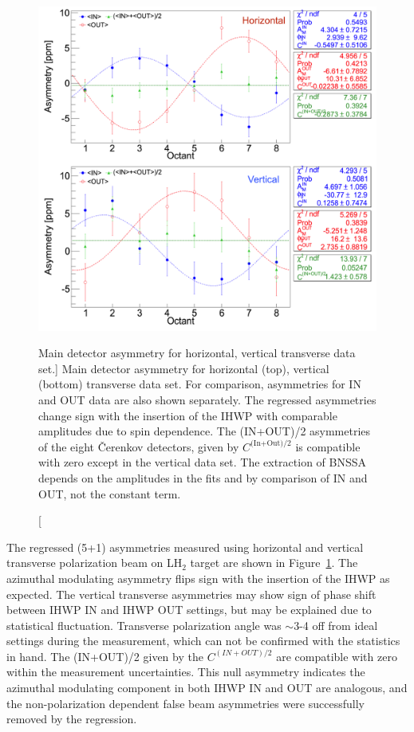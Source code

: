 \begin{figure}[!h]
	\begin{center}
	\includegraphics[width=15.0cm]{figures/asymmetry_In_Out_H2}
	\end{center}
	\caption
	[Main detector asymmetry for horizontal, vertical transverse data set.]
	{Main detector asymmetry for horizontal (top), vertical (bottom) transverse data set. For comparison, asymmetries for IN and OUT data are also shown separately. The regressed asymmetries change sign with the insertion of the IHWP with comparable amplitudes due to spin dependence. The (IN+OUT)/2 asymmetries of the eight \v{C}erenkov detectors, given by $C^\textrm{(In+Out)/2}$ is compatible with zero except in the vertical data set. The extraction of BNSSA depends on the amplitudes in the fits and by comparison of IN and OUT, not the constant term.}
	\label{fig:asymmetry_In_Out_H2}
\end{figure}



The regressed (5+1) asymmetries measured using horizontal and vertical transverse polarization beam on LH$_{2}$ target are shown in Figure~\ref{fig:asymmetry_In_Out_H2}. The azimuthal modulating asymmetry flips sign with the insertion of the IHWP as expected. The vertical transverse asymmetries may show sign of phase shift between IHWP IN and IHWP OUT settings, but may be explained due to statistical fluctuation. Transverse polarization angle was $\sim$3-4\degrees{} off from ideal settings during the measurement, which can not be confirmed with the statistics in hand. The (IN+OUT)/2 given by the $C^{(IN+OUT)/2}$ are compatible with zero  within the measurement uncertainties. This null asymmetry indicates the azimuthal modulating component in both IHWP IN and OUT are analogous, and the non-polarization dependent false beam asymmetries were successfully removed by the regression.

